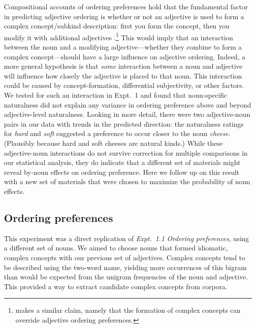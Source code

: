 \documentclass[12pt]{article}
\begin{document}
Compositional accounts of ordering preferences hold that the fundamental factor in predicting adjective ordering is whether or not an adjective is used to form a complex concept/subkind description: first you form the concept, then you modify it with additional adjectives \citep{McNally2004,svenonius2008}.\footnote{\cite{bouchard2005} makes a similar claim, namely that the formation of complex concepts can override adjective ordering preferences.} 
This would imply that an interaction between the noun and a modifying adjective---whether they combine to form a complex concept---should have a large influence on adjective ordering. 
Indeed, a more general hypothesis is that \emph{some} interaction between a noun and adjective will influence how closely the adjective is placed to that noun. This interaction could be caused by concept-formation, differential subjectivity, or other factors. We tested for such an interaction in Expt.~1 and found that noun-specific naturalness did not explain any variance in ordering preference above and beyond adjective-level naturalness. Looking in more detail, there were two adjective-noun pairs in our data with trends in the predicted direction: the naturalness ratings for \emph{hard} and \emph{soft} suggested a preference to occur closer to the noun \emph{cheese}. (Plausibly because hard and soft cheeses are natural kinds.) While these adjective-noun interactions do not survive correction for multiple comparisons in our statistical analysis, they do indicate that a different set of materials might reveal by-noun effects on ordering preference. Here we follow up on this result with a new set of materials that were chosen to maximize the probability of noun effects.


\subsection{Ordering preferences}

This experiment was a direct replication of \emph{Expt.~1.1 Ordering preferences}, using a different set of nouns. We aimed to choose nouns that formed idiomatic, complex concepts with our previous set of adjectives. Complex concepts tend to be described using the two-word name, yielding more occurrences of this bigram than would be expected from the unigram frequencies of the noun and adjective. This provided a way to extract candidate complex concepts from corpora.

\end{document}

